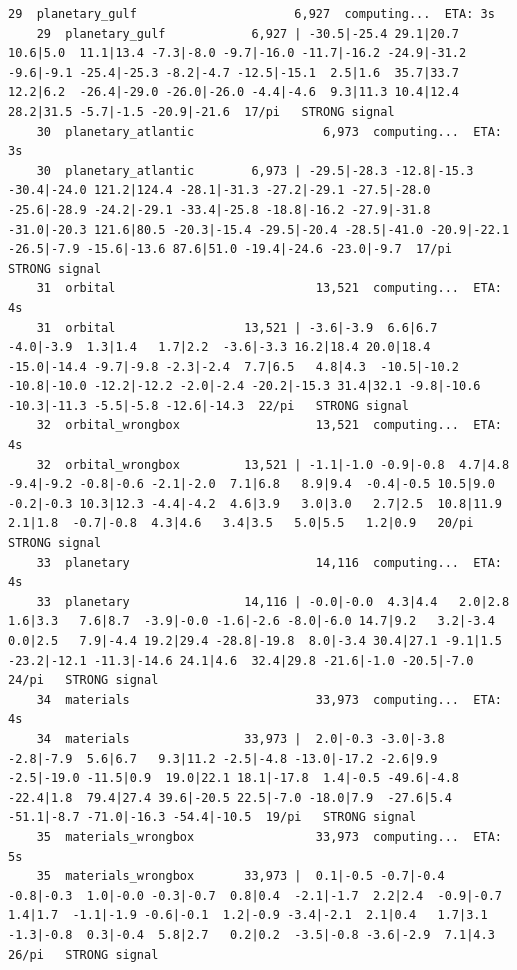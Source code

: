 \documentclass[11pt, letterpaper, openany]{book}
\begin{document}
\begin{empiricalbox}
\begin{lstlisting}[style=terminal]
    29  planetary_gulf                      6,927  computing...  ETA: 3s
    29  planetary_gulf            6,927 | -30.5|-25.4 29.1|20.7 10.6|5.0  11.1|13.4 -7.3|-8.0 -9.7|-16.0 -11.7|-16.2 -24.9|-31.2 -9.6|-9.1 -25.4|-25.3 -8.2|-4.7 -12.5|-15.1  2.5|1.6  35.7|33.7 12.2|6.2  -26.4|-29.0 -26.0|-26.0 -4.4|-4.6  9.3|11.3 10.4|12.4 28.2|31.5 -5.7|-1.5 -20.9|-21.6  17/pi   STRONG signal
    30  planetary_atlantic                  6,973  computing...  ETA: 3s
    30  planetary_atlantic        6,973 | -29.5|-28.3 -12.8|-15.3 -30.4|-24.0 121.2|124.4 -28.1|-31.3 -27.2|-29.1 -27.5|-28.0 -25.6|-28.9 -24.2|-29.1 -33.4|-25.8 -18.8|-16.2 -27.9|-31.8 -31.0|-20.3 121.6|80.5 -20.3|-15.4 -29.5|-20.4 -28.5|-41.0 -20.9|-22.1 -26.5|-7.9 -15.6|-13.6 87.6|51.0 -19.4|-24.6 -23.0|-9.7  17/pi   STRONG signal
    31  orbital                            13,521  computing...  ETA: 4s
    31  orbital                  13,521 | -3.6|-3.9  6.6|6.7  -4.0|-3.9  1.3|1.4   1.7|2.2  -3.6|-3.3 16.2|18.4 20.0|18.4 -15.0|-14.4 -9.7|-9.8 -2.3|-2.4  7.7|6.5   4.8|4.3  -10.5|-10.2 -10.8|-10.0 -12.2|-12.2 -2.0|-2.4 -20.2|-15.3 31.4|32.1 -9.8|-10.6 -10.3|-11.3 -5.5|-5.8 -12.6|-14.3  22/pi   STRONG signal
    32  orbital_wrongbox                   13,521  computing...  ETA: 4s
    32  orbital_wrongbox         13,521 | -1.1|-1.0 -0.9|-0.8  4.7|4.8  -9.4|-9.2 -0.8|-0.6 -2.1|-2.0  7.1|6.8   8.9|9.4  -0.4|-0.5 10.5|9.0  -0.2|-0.3 10.3|12.3 -4.4|-4.2  4.6|3.9   3.0|3.0   2.7|2.5  10.8|11.9  2.1|1.8  -0.7|-0.8  4.3|4.6   3.4|3.5   5.0|5.5   1.2|0.9   20/pi   STRONG signal
    33  planetary                          14,116  computing...  ETA: 4s
    33  planetary                14,116 | -0.0|-0.0  4.3|4.4   2.0|2.8   1.6|3.3   7.6|8.7  -3.9|-0.0 -1.6|-2.6 -8.0|-6.0 14.7|9.2   3.2|-3.4  0.0|2.5   7.9|-4.4 19.2|29.4 -28.8|-19.8  8.0|-3.4 30.4|27.1 -9.1|1.5  -23.2|-12.1 -11.3|-14.6 24.1|4.6  32.4|29.8 -21.6|-1.0 -20.5|-7.0  24/pi   STRONG signal
    34  materials                          33,973  computing...  ETA: 4s
    34  materials                33,973 |  2.0|-0.3 -3.0|-3.8 -2.8|-7.9  5.6|6.7   9.3|11.2 -2.5|-4.8 -13.0|-17.2 -2.6|9.9  -2.5|-19.0 -11.5|0.9  19.0|22.1 18.1|-17.8  1.4|-0.5 -49.6|-4.8 -22.4|1.8  79.4|27.4 39.6|-20.5 22.5|-7.0 -18.0|7.9  -27.6|5.4  -51.1|-8.7 -71.0|-16.3 -54.4|-10.5  19/pi   STRONG signal
    35  materials_wrongbox                 33,973  computing...  ETA: 5s
    35  materials_wrongbox       33,973 |  0.1|-0.5 -0.7|-0.4 -0.8|-0.3  1.0|-0.0 -0.3|-0.7  0.8|0.4  -2.1|-1.7  2.2|2.4  -0.9|-0.7  1.4|1.7  -1.1|-1.9 -0.6|-0.1  1.2|-0.9 -3.4|-2.1  2.1|0.4   1.7|3.1  -1.3|-0.8  0.3|-0.4  5.8|2.7   0.2|0.2  -3.5|-0.8 -3.6|-2.9  7.1|4.3   26/pi   STRONG signal

\end{lstlisting}
\end{empiricalbox}
\end{document}
